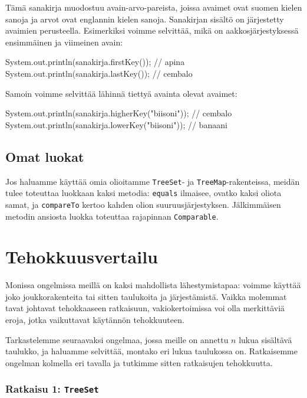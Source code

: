 Tämä sanakirja muodostuu avain-arvo-pareista,
joissa avaimet ovat suomen kielen sanoja
ja arvot ovat englannin kielen sanoja.
Sanakirjan sisältö on järjestetty avaimien perusteella.
Esimerkiksi voimme selvittää, mikä on aakkosjärjestyksessä
ensimmäinen ja viimeinen avain:

\begin{code}
System.out.println(sanakirja.firstKey()); // apina
System.out.println(sanakirja.lastKey()); // cembalo
\end{code}

Samoin voimme selvittää lähinnä tiettyä avainta olevat avaimet:

\begin{code}
System.out.println(sanakirja.higherKey("biisoni")); // cembalo
System.out.println(sanakirja.lowerKey("biisoni")); // banaani
\end{code}

\subsection{Omat luokat}

Jos haluamme käyttää omia olioitamme \texttt{TreeSet}- ja
\texttt{TreeMap}-rakenteissa, meidän tulee toteuttaa
luokkaan kaksi metodia:
\texttt{equals} ilmaisee, ovatko kaksi oliota samat,
ja \texttt{compareTo} kertoo kahden olion suuruusjärjestyksen.
Jälkimmäisen metodin ansiosta luokka toteuttaa rajapinnan
\texttt{Comparable}.

\section{Tehokkuusvertailu}

Monissa ongelmissa meillä on kaksi mahdollista lähestymistapaa:
voimme käyttää joko joukkorakenteita tai sitten taulukoita ja järjestämistä.
Vaikka molemmat tavat johtavat tehokkaaseen ratkaisuun,
vakiokertoimissa voi olla merkittäviä eroja, jotka vaikuttavat
käytännön tehokkuuteen.

Tarkastelemme seuraavaksi ongelmaa, jossa meille on annettu
$n$ lukua sisältävä taulukko, ja haluamme selvittää,
montako eri lukua taulukossa on.
Ratkaisemme ongelman kolmella eri tavalla ja tutkimme sitten
ratkaisujen tehokkuutta.

\subsubsection{Ratkaisu 1: \texttt{TreeSet}}

